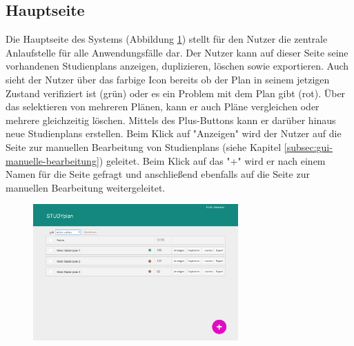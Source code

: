\subsection{Hauptseite}
\label{subsec:gui-hauptseite}
Die Hauptseite des Systems (Abbildung \ref{fig:gui-hauptseite-1}) stellt für den Nutzer die zentrale Anlaufstelle für alle Anwendungsfälle dar. Der Nutzer kann auf dieser Seite seine vorhandenen \glspl{Studienplan} anzeigen, duplizieren, löschen sowie exportieren. Auch sieht der Nutzer über das farbige Icon bereits ob der Plan in seinem jetzigen Zustand verifiziert ist (grün) oder es ein Problem mit dem Plan gibt (rot). Über das selektieren von mehreren Plänen, kann er auch Pläne vergleichen oder mehrere gleichzeitig löschen. Mittels des Plus-Buttons kann er darüber hinaus neue \glspl{Studienplan} erstellen.\newline
Beim Klick auf "Anzeigen" wird der Nutzer auf die Seite zur manuellen Bearbeitung von \glspl{Studienplan} (siehe Kapitel \ref{subsec:gui-manuelle-bearbeitung}) geleitet. Beim Klick auf das "+" wird er nach einem Namen für die Seite gefragt und anschließend ebenfalls auf die Seite zur manuellen Bearbeitung weitergeleitet.
\begin{figure}[!htb]
	\caption{}
	\label{fig:gui-hauptseite-1}
	\centering
	\includegraphics[width=0.7\textwidth]{../GUI/ergebnisse/hauptseite-1.png}
\end{figure}


